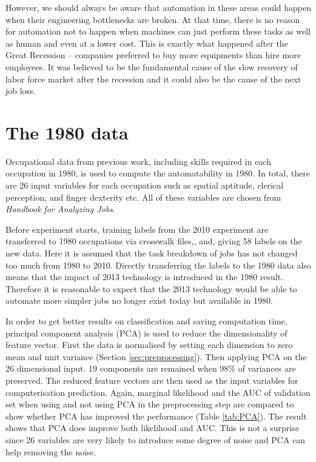 \documentclass[11pt]{report}
\numberwithin{equation}{chapter}
\begin{document}
\begin{spacing}{2}
However, we should always be aware that automation in these areas could happen when their engineering bottlenecks are broken. At that time, there is no reason for automation not to happen when machines can just perform these tasks as well as human and even at a lower cost. This is exactly what happened after the Great Recession -- companies preferred to buy more equipments than hire more employees. It was believed to be the fundamental cause of the slow recovery of labor force market after the recession\cite{brynjolfsson2012race} and it could also be the cause of the next job loss.








\newpage
\section{The 1980 data}
Occupational data from previous work\cite{david2001skill}, including skills required in each occupation in 1980, is used to compute the automatability in 1980. In total, there are 26 input variables for each occupation such as spatial aptitude, clerical perception, and finger dexterity etc. All of these variables are chosen from \textit{Handbook for Analyzing Jobs}\footnotemark. 


Before experiment starts, training labels from the 2010 experiment are transferred to 1980 occupations via crosswalk files\cite{SOC2010_2000},\cite{SOC2000_OCC}, and\cite{OCC2000_1990}, giving 58 labels on the new data. Here it is assumed that the task breakdown of jobs has not changed too much from 1980 to 2010. Directly transferring the labels to the 1980 data also means that the impact of 2013 technology is introduced in the 1980 result. Therefore it is reasonable to expect that the 2013 technology would be able to automate more simpler jobs no longer exist today but available in 1980. 

In order to get better results on classification and saving computation time, principal component analysis (PCA) is used to reduce the dimensionality of feature vector. First the data is normalised by setting each dimension to zero mean and unit variance (Section \ref{sec:preprocessing}). Then applying PCA on the 26 dimensional input. 19 components are remained when 98\% of variances are preserved. The reduced feature vectors are then used as the input variables for computerisation prediction. Again, marginal likelihood and the AUC of validation set when using and not using PCA in the preprocessing step are compared to show whether PCA has improved the performance (Table \ref{tab:PCA}). The result shows that PCA does improve both likelihood and AUC. This is not a surprise since 26 variables are very likely to introduce some degree of noise and PCA can help removing the noise. \\



\end{spacing}
\end{document}

